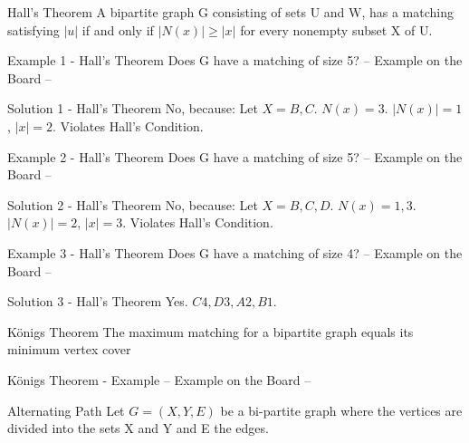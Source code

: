 \begin{frame}{Hall's Theorem}
A bipartite graph G consisting of sets U and W, has a matching satisfying $|u|$ if and only if $|N(x)| \geq |x|$ for every nonempty subset X of U.
  
\end{frame}

\begin{frame}{Example 1 - Hall's Theorem}
Does G have a matching of size 5?
-- Example on the Board -- 
\end{frame}

\begin{frame}{Solution 1 - Hall's Theorem}
No, because: Let $X = {B,C}$. $N(x) = {3}$. $|N(x)| = 1$, $|x| = 2$. Violates Hall’s Condition.
  
\end{frame}

\begin{frame}{Example 2 - Hall's Theorem}
Does G have a matching of size 5?
 -- Example on the Board -- 
\end{frame}

\begin{frame}{Solution 2 - Hall's Theorem}
No, because: Let $X = {B,C,D}$. $N(x) = {1,3}$. $|N(x)| = 2$, $|x| = 3$. Violates Hall’s Condition.
  
\end{frame}

\begin{frame}{Example 3 - Hall's Theorem}
Does G have a matching of size 4?
-- Example on the Board -- 
\end{frame}

\begin{frame}{Solution 3 - Hall's Theorem}
Yes. ${C4, D3, A2, B1}$. 
  
\end{frame}
  
\begin{frame}{Königs Theorem}
The maximum matching for a bipartite graph equals its minimum vertex cover
  
\end{frame}

\begin{frame}{Königs Theorem - Example}
-- Example on the Board -- 
  
\end{frame}

\begin{frame}{Alternating Path}
Let $G = (X, Y, E)$ be a bi-partite graph where the vertices are divided into the sets X and Y and E the edges.
  
\end{frame}

